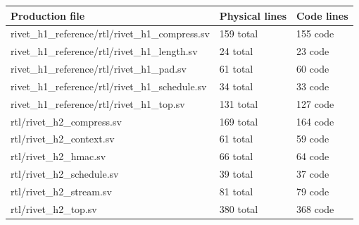 \documentclass[11pt,a4paper]{article}
\begin{document}
{\small\renewcommand{\arraystretch}{1.18}\begin{longtable}{@{}L{0.55\textwidth}|L{0.18\textwidth}|L{0.18\textwidth}@{}}\toprule

\textbf{Production file} & \textbf{Physical lines} & \textbf{Code lines}\\\midrule\endhead

rivet\_\allowbreak{}h1\_\allowbreak{}reference/\allowbreak{}rtl/\allowbreak{}rivet\_\allowbreak{}h1\_\allowbreak{}compress.sv & 159 total & 155 code\\[2pt]\hline

rivet\_\allowbreak{}h1\_\allowbreak{}reference/\allowbreak{}rtl/\allowbreak{}rivet\_\allowbreak{}h1\_\allowbreak{}length.sv & 24 total & 23 code\\[2pt]\hline

rivet\_\allowbreak{}h1\_\allowbreak{}reference/\allowbreak{}rtl/\allowbreak{}rivet\_\allowbreak{}h1\_\allowbreak{}pad.sv & 61 total & 60 code\\[2pt]\hline

rivet\_\allowbreak{}h1\_\allowbreak{}reference/\allowbreak{}rtl/\allowbreak{}rivet\_\allowbreak{}h1\_\allowbreak{}schedule.sv & 34 total & 33 code\\[2pt]\hline

rivet\_\allowbreak{}h1\_\allowbreak{}reference/\allowbreak{}rtl/\allowbreak{}rivet\_\allowbreak{}h1\_\allowbreak{}top.sv & 131 total & 127 code\\[2pt]\hline

rtl/\allowbreak{}rivet\_\allowbreak{}h2\_\allowbreak{}compress.sv & 169 total & 164 code\\[2pt]\hline

rtl/\allowbreak{}rivet\_\allowbreak{}h2\_\allowbreak{}context.sv & 61 total & 59 code\\[2pt]\hline

rtl/\allowbreak{}rivet\_\allowbreak{}h2\_\allowbreak{}hmac.sv & 66 total & 64 code\\[2pt]\hline

rtl/\allowbreak{}rivet\_\allowbreak{}h2\_\allowbreak{}schedule.sv & 39 total & 37 code\\[2pt]\hline

rtl/\allowbreak{}rivet\_\allowbreak{}h2\_\allowbreak{}stream.sv & 81 total & 79 code\\[2pt]\hline

rtl/\allowbreak{}rivet\_\allowbreak{}h2\_\allowbreak{}top.sv & 380 total & 368 code\\[2pt]\hline

\bottomrule\end{longtable}}
\end{document}
